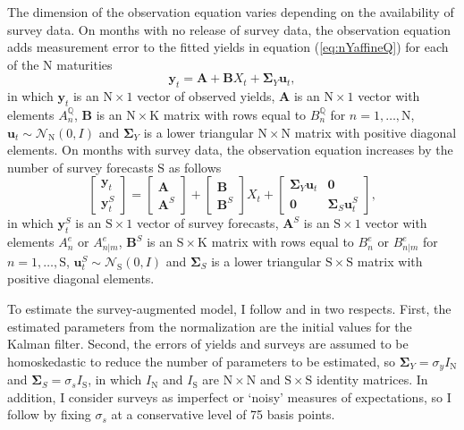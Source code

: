 \documentclass[a4paper, 12pt]{article}
\providecommand{\tnr}{n}
\providecommand{\tnrfwd}{m}
\providecommand{\idxt}{t}
\providecommand{\idxsfwd}{\tnr | \tnrfwd}
\providecommand{\yld}{y}
\providecommand{\xpc}{e}
\providecommand{\Xvars}{X_{\idxt}}
\providecommand{\affineA}{A_{\tnr}}
\providecommand{\affineB}{B_{\tnr}}
\providecommand{\affineAQ}{\affineA^{\Qmeasure}}
\providecommand{\affineBQ}{\affineB^{\Qmeasure}}
\providecommand{\affineAe}{\affineA^{\xpc}}
\providecommand{\affineBe}{\affineB^{\xpc}}
\providecommand{\affineAeFwd}{A_{\idxsfwd}^{\xpc}}
\providecommand{\affineBeFwd}{B_{\idxsfwd}^{\xpc}}
\providecommand{\Xdim}{\mathrm{K}}
\providecommand{\Ydim}{\mathrm{N}}
\providecommand{\Sdim}{\mathrm{S}}
\providecommand{\Normal}{\mathcal{N}}
\providecommand{\Qmeasure}{\mathbb{Q}}
\providecommand{\Svy}{S}
\providecommand{\yVec}{\mathbf{\yld}_{t}}
\providecommand{\ySVec}{\yVec^{\Svy}}
\providecommand{\Avec}{\mathbf{A}}
\providecommand{\Bvec}{\mathbf{B}}
\providecommand{\ASvec}{\mathbf{A}^{\Svy}}
\providecommand{\BSvec}{\mathbf{B}^{\Svy}}
\providecommand{\uVec}{\mathbf{u}_{t}}
\providecommand{\uSVec}{\mathbf{u}_{t}^{\Svy}}
\providecommand{\Svec}{\mathbf{\Sigma}}
\providecommand{\SyVec}{\mathbf{\Svec}_{Y}}
\providecommand{\SsVec}{\mathbf{\Svec}_{\Svy}}
\newcommand{\eqyVecY}{\yVec = \Avec + \Bvec \Xvars + \SyVec \uVec}
\begin{document}
The dimension of the observation equation varies depending on the availability of survey data. On months with no release of survey data, the observation equation adds measurement error to the fitted yields in equation (\ref{eq:nYaffineQ}) for each of the \(\Ydim\) maturities
\begin{equation} \label{eq:nYaffineY}
\eqyVecY,
\end{equation}
\noindent in which \(\yVec\) is an \(\Ydim \times 1\) vector of observed yields, \(\Avec\) is an \(\Ydim \times 1\) vector with elements \(\affineAQ\), \(\Bvec\) is an \(\Ydim \times \Xdim\) matrix with rows equal to \(\affineBQ\) for \(n = 1, \ldots, \Ydim\), \(\uVec \sim \Normal_\Ydim (0,I) \) and \(\SyVec\) is a lower triangular \(\Ydim \times \Ydim\) matrix with positive diagonal elements. On months with survey data, the observation equation increases by the number of survey forecasts \(\Sdim\) as follows 
\begin{equation} \label{eq:nYaffineYS}
\begin{bmatrix}
\yVec \\ 
\ySVec
\end{bmatrix} 
= 
\begin{bmatrix}
\Avec \\
\ASvec
\end{bmatrix} 
+
\begin{bmatrix}
\Bvec \\
\BSvec  
\end{bmatrix} 
\Xvars
+
\begin{bmatrix}
\SyVec \uVec & \mathbf{0} \\
\mathbf{0}     & \SsVec \uSVec
\end{bmatrix} ,
\end{equation}
\noindent in which \(\ySVec\) is an \(\Sdim \times 1\) vector of survey forecasts, \(\ASvec\) is an \(\Sdim \times 1\) vector with elements \(\affineAe\) or \(\affineAeFwd\), \(\BSvec\) is an \(\Sdim \times \Xdim\) matrix with rows equal to \(\affineBe\) or \(\affineBeFwd\) for \(n = 1, \ldots, \Sdim\), \(\uSVec \sim \Normal_\Sdim (0,I) \) and \(\SsVec\) is a lower triangular \(\Sdim \times \Sdim\) matrix with positive diagonal elements. 

To estimate the survey-augmented model, I follow \cite{Guimaraes:2014} and \cite{Lloyd:2020} in two respects. First, the estimated parameters from the \cite{JSZ:2011} normalization are the initial values for the Kalman filter. Second, the errors of yields and surveys are assumed to be homoskedastic to reduce the number of parameters to be estimated, so \(\SyVec = \sigma_y I_{\Ydim}\) and \(\SsVec = \sigma_s I_{\Sdim}\), in which \(I_{\Ydim}\) and \(I_{\Sdim}\) are \(\Ydim \times \Ydim\) and \(\Sdim \times \Sdim\) identity matrices. In addition, I consider surveys as imperfect or `noisy' measures of expectations, so I follow \cite{KimOrphanides:2012} by fixing \(\sigma_s\) at a conservative level of 75 basis points. 
\end{document}
